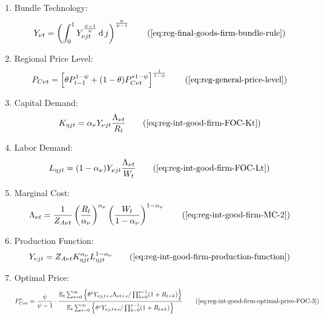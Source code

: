\documentclass[
	thesis.tex
	]{subfiles}
\begin{document}
{\begin{itemize}
\begin{enumerate}
			\item Bundle Technology:
			\begin{align}
				Y_{\nu t} = \left( \int_{0}^{1} Y_{\nu jt}^{\frac{\psi-1}{\psi}} \dif j \right)^{\frac{\psi}{\psi-1}}
				\tag{\ref{eq:reg-final-goods-firm-bundle-rule}}
			\end{align}
			
			\item Regional Price Level:
			\begin{align}
				P_{C\nu t} = \left[ \theta P_{t-1}^{1-\psi} + (1-\theta) P_{C\nu t}^{\ast 1-\psi} \right]^\frac{1}{1-\psi}
				\tag{\ref{eq:reg-general-price-level}}
			\end{align}
			
			\item Capital Demand:
			\begin{align}
				K_{\eta jt} = {\alpha_\nu} Y_{\nu jt} \frac{\Lambda_{\nu t}}{R_t}
				\tag{\ref{eq:reg-int-good-firm-FOC-Kt}}
			\end{align}
			
			\item Labor Demand:
			\begin{align}
				L_{\eta jt} = (1-{\alpha_\nu}) Y_{\nu jt} \frac{\Lambda_{\nu t}}{W_t}
				\tag{\ref{eq:reg-int-good-firm-FOC-Lt}}
			\end{align}
			
			
			\item Marginal Cost:
			\begin{align}
				\Lambda_{\nu t} = \frac{1}{Z_{A\nu t}} \left( \frac{R_t}{{\alpha_\nu}} \right)^{{\alpha_\nu}} \left( \frac{W_t}{1-{\alpha_\nu}} \right)^{1-{\alpha_\nu}}
				\tag{\ref{eq:reg-int-good-firm-MC-2}}
			\end{align}
			
			\item Production Function:
			\begin{align}
				Y_{\nu jt} = Z_{A\nu t} K_{\eta jt}^{\alpha_\nu} L_{\eta jt}^{1-{\alpha_\nu}}
				\tag{\ref{eq:reg-int-good-firm-production-function}}
			\end{align}
			
			\item Optimal Price:
			\begin{align}
				P_{C\nu t}^\ast = \frac{\psi}{\psi-1} \cdot \frac{ \E \sum_{s=0}^{\infty} \left\{ \theta^s Y_{\nu j,t+s} \Lambda_{\nu t+s} / \prod_{k=0}^{s-1}(1+R_{t+k}) \right\} } {\E \sum_{s=0}^{\infty} \left\{ \theta^s Y_{\nu j,t+s} / \prod_{k=0}^{s-1}(1 + R_{t+k}) \right\}} \tag{\ref{eq:reg-int-good-firm-optimal-price-FOC-3}}
			\end{align}
			

\end{enumerate}
\end{itemize}}
\end{document}
